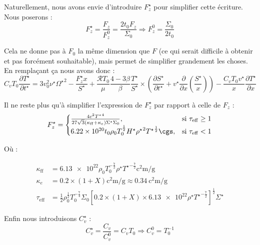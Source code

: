 Naturellement, nous avons envie d’introduire $F_z^\star$ pour simplifier cette
écriture. Nous poserons :
\begin{equation}
    F_z^\star = \frac{F_z}{F_z^0} = \frac{2 t_0 F_z}{\Sigma_0} \Rightarrow F_z^0 = \frac{\Sigma_0}{2 t_0}
\end{equation}

Cela ne donne pas à $F_0$ la même dimension que $F$ (ce qui serait difficile à
obtenir et pas forcément souhaitable), mais permet de simplifier grandement les
choses. En remplaçant ça nous avons donc :
\begin{equation}
    C_v T_0 \frac{\partial T^{\star}}{\partial t^{\star}} =
    3 v_0^2 \nu^\star {\Omega^\star}^2 - \frac{F_z^\star x}{S^\star} +
    \frac{\mathcal{R} T_0}{\mu} \frac{4-3\beta}{\beta} \frac{T^\star}{S^\star} \times
    \left( \frac{\partial S^\star}{\partial t^\star} + v^\star \frac{\partial}{\partial x} \left(\frac{S^\star}{x}\right) \right) -
    \frac{C_v T_0 v^\star}{x} \frac{\partial T^\star}{\partial x}
\end{equation}

Il ne reste plus qu’à simplifier l’expression de $F_z^\star$ par rapport à
celle de $F_z$ :
\begin{equation}
    F_z^\star =
    \begin{cases}
        \frac{4 c^2 {T^\star}^4}{27 \sqrt{3} (\kappa_\mathrm{ff} + \kappa_e)\Sigma^\star \Sigma_0}, &\text{si $\tau_\mathrm{eff} \geq 1$} \\
        \num{6.22e20} t_0 \rho_0 T_0^\frac{1}{2} H^\star {\rho^\star}^2 {T^\star}^\frac{1}{2} \si{\cgs}, &\text{si $\tau_\mathrm{eff} < 1$}
    \end{cases}
\end{equation}

Où :

\begin{align}
    \kappa_\mathrm{ff} &= \num{6.13e22} \rho_0 T_0^{-\frac{7}{2}} \rho^\star {T^\star}^{-\frac{7}{2}} \si{\square\centi\meter\per\gram} \\
    \kappa_e &= 0.2 \times (1 + X) \si{\square\centi\meter\per\gram} \approx \SI{0.34}{\square\centi\meter\per\gram} \\
    \tau_\mathrm{eff} &= \frac{1}{2} \rho_0^\frac{1}{2} T_0^{-\frac{7}{4}} \Sigma_0 \left[ 0.2 \times (1 + X) \times \num{6.13e22} \rho^\star {T^\star}^{-\frac{7}{2}} \right]^\frac{1}{2} \Sigma^\star
\end{align}

Enfin nous introduisons $C_v^\star$ :
\begin{equation}
    C_v^\star = \frac{C_v}{C_v^0} = C_v T_0 \Rightarrow C_v^0 = T_0^{-1}
\end{equation} 

